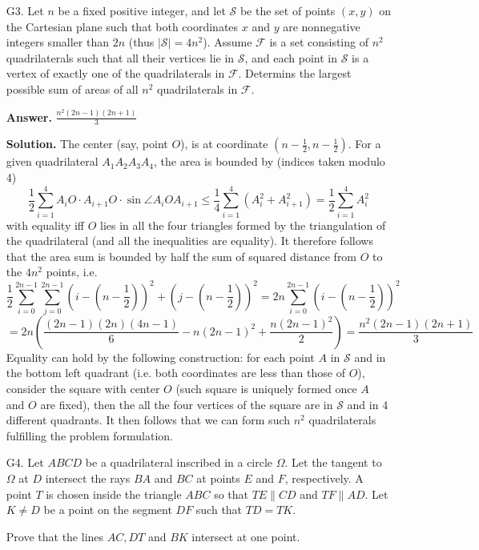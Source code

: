\documentclass[11pt,a4paper]{article}
\begin{document}
\begin{enumerate}
		\item [G3.] 
		Let $n$ be a fixed positive integer, and let $\mathcal{S}$ be the set of points $(x, y)$ on the Cartesian plane such that both coordinates $x$ and $y$ are nonnegative integers smaller than $2n$ (thus $|\mathcal{S}| = 4n^2$). 
		Assume $\mathcal{F}$ is a set consisting of $n^2$ quadrilaterals such that all their vertices lie in $\mathcal{S}$,
		 and each point in $\mathcal{S}$ is a vertex of exactly one of the quadrilaterals in $\mathcal{F}$.
		Determins the largest possible sum of areas of all $n^2$ quadrilaterals in $\mathcal{F}$.
		
		\textbf{Answer.} $\frac{n^2(2n-1)(2n+1)}{3}$
		
		\textbf{Solution.} 
		The center (say, point $O$), is at coordinate $(n - \frac 12, n - \frac 12)$. 
		For a given quadrilateral $A_1A_2A_3A_4$, the area is bounded by (indices taken modulo 4)
		\[
		\frac 12\sum_{i=1}^4 A_iO\cdot A_{i+1}O\cdot \sin\angle A_iOA_{i+1}
		\le \frac 14\sum_{i=1}^4 (A_i^2 + A_{i+1}^2)
		=\frac 12\sum_{i=1}^4 A_i^2
		\]
		with equality iff $O$ lies in all the four triangles formed by the triangulation of the quadrilateral 
		(and all the inequalities are equality). 
		It therefore follows that the area sum is bounded by half the sum of squared distance from $O$ to the $4n^2$ points, i.e. 
		\[
		\frac 12 \sum_{i=0}^{2n-1}\sum_{j=0}^{2n-1} (i - (n - \frac 12))^2 + (j - (n - \frac 12))^2 
		= 2n\sum_{i=0}^{2n - 1} (i - (n - \frac 12))^2
		\]\[
		=2n(\frac{(2n-1)(2n)(4n-1)}{6} - n(2n - 1)^2 + \frac{n(2n-1)^2}{2})
		=\frac{n^2(2n-1)(2n+1)}{3}
		\]
		Equality can hold by the following construction: for each point $A$ in $\mathcal{S}$ and in the bottom left quadrant (i.e. both coordinates are less than those of $O$), 
		consider the square with center $O$ (such square is uniquely formed once $A$ and $O$ are fixed), 
		then the all the four vertices of the square are in $\mathcal{S}$ and in 4 different quadrants. 
		It then follows that we can form such $n^2$ quadrilaterals fulfilling the problem formulation. 
		
		\item [G4.] 
		Let $ABCD$ be a quadrilateral inscribed in a circle $\Omega$. 
		Let the tangent to $\Omega$ at $D$ intersect the rays $BA$ and $BC$ at points $E$ and $F$, respectively. 
		A point $T$ is chosen inside the triangle $ABC$ so that $TE \parallel CD$ and $TF \parallel AD$. Let $K \neq D$ be a point on the segment $DF$ such that $TD = TK$.
		
		Prove that the lines $AC, DT$ and $BK$ intersect at one point.
		

\end{enumerate}
\end{document}
